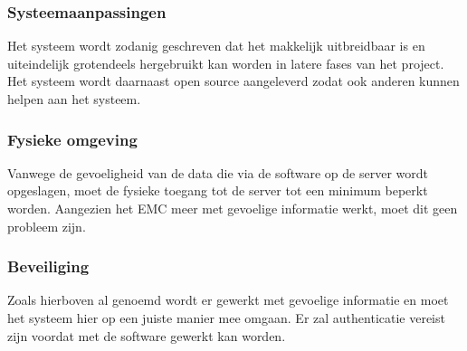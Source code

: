 \subsubsection{Systeemaanpassingen}
Het systeem wordt zodanig geschreven dat het makkelijk uitbreidbaar is en uiteindelijk grotendeels hergebruikt kan worden in latere fases van het project. 
Het systeem wordt daarnaast open source aangeleverd zodat ook anderen kunnen helpen aan het systeem.

\subsubsection{Fysieke omgeving}
Vanwege de gevoeligheid van de data die via de software op de server wordt opgeslagen, moet de fysieke toegang tot de server tot een minimum beperkt worden. 
Aangezien het EMC meer met gevoelige informatie werkt, moet dit geen probleem zijn.

\subsubsection{Beveiliging}
Zoals hierboven al genoemd wordt er gewerkt met gevoelige informatie en moet het systeem hier op een juiste manier mee omgaan. 
Er zal authenticatie vereist zijn voordat met de software gewerkt kan worden.
